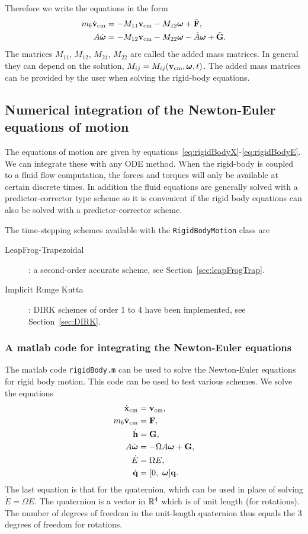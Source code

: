 Therefore we write the equations in the form
\begin{align}
   m_{b} \dot{\mathbf{ v}}_{\rm cm} &=  -M_{11} \mathbf{ v}_{\rm cm} - M_{12} \boldsymbol{\omega} + \tilde{\mathbf{ F}},  \\
   A \dot{\boldsymbol{\omega}} &=  -M_{12} \mathbf{ v}_{\rm cm} - M_{22} \boldsymbol{\omega}  -\dot A\boldsymbol{\omega}  + \tilde{\mathbf{ G}}.
\end{align}
The matrices $M_{11}$, $M_{12}$, $M_{21}$, $M_{22}$ are called the added mass matrices. In general
they can depend on the solution, $M_{ij}=M_{ij}(\mathbf{ v}_{\rm cm},\boldsymbol{\omega},t)$. The added mass matrices can
be provided by the user when solving the rigid-body equations. 


\subsection{Numerical integration of the Newton-Euler equations of motion}

The equations of motion are given by equations~\eqref{eq:rigidBodyX}-\eqref{eq:rigidBodyE}.
We can integrate these with any ODE method.
When the rigid-body is coupled to a fluid flow computation, the forces and torques will
only be available at certain discrete times. In addition the fluid equations are generally
solved with a predictor-corrector type scheme so it is convenient if the rigid body
equations can also be solved with a predictor-corrector scheme.

The time-stepping schemes available with the {\tt RigidBodyMotion} class are
\begin{description} 
  \item[LeapFrog-Trapezoidal] : a second-order accurate scheme, see Section~\ref{sec:leapFrogTrap}.
  \item[Implicit Runge Kutta] : DIRK schemes of order 1 to 4 have been implemented, 
            see Section~\ref{sec:DIRK}.
\end{description}


\subsubsection{A matlab code for integrating the Newton-Euler equations} \label{sec:matlabNewtonEuler}


The matlab code {\tt rigidBody.m} can be used to solve the Newton-Euler equations for 
rigid body motion. This code can be used to test various schemes. 
We solve the equations
\begin{align}
   \dot{\mathbf{ x}}_{\rm cm} &= \mathbf{ v}_{\rm cm} , \\
   m_{b} \dot{\mathbf{ v}}_{\rm cm} &= \mathbf{ F} ,\\
   \dot {\mathbf{ h}} &= \mathbf{ G} , \\
   A \dot {\boldsymbol{\omega}} & = - \Omega A \boldsymbol{\omega} + \mathbf{ G} , \\
   \dot E &= \Omega E ,\\
   \dot {\mathbf{ q}} &= [ 0,~ \boldsymbol{\omega} ] \mathbf{ q} . 
\end{align}
The last equation is that for the quaternion, which can be used in place of solving $\dot E = \Omega E$.
The quaternion is a vector in ${\mathbb R}^4$ which is of unit length (for rotations). The number of
degrees of freedom in the unit-length quaternion thus equals the 3 degrees of freedom for rotations. 


